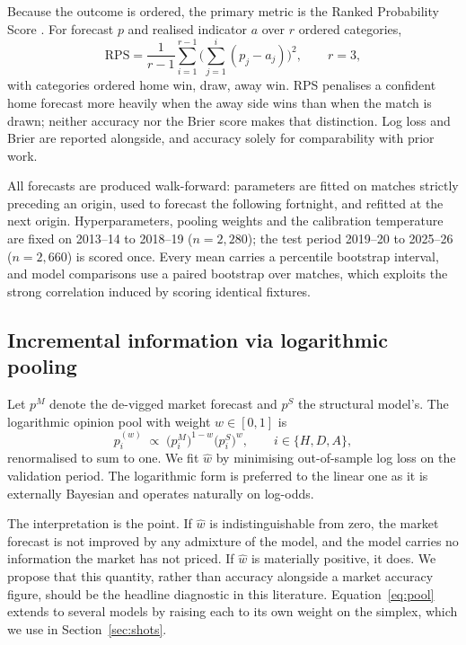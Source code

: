 \documentclass[11pt]{article}
\newcommand{\RPS}{\mathrm{RPS}}
\begin{document}
Because the outcome is ordered, the primary metric is the Ranked Probability
Score \citep{epstein1969,constantinou2012}. For forecast $p$ and realised
indicator $a$ over $r$ ordered categories,
\begin{equation}
\RPS = \frac{1}{r-1}\sum_{i=1}^{r-1}\Bigg(\sum_{j=1}^{i}(p_j - a_j)\Bigg)^{\!2},
\qquad r = 3 ,
\end{equation}
with categories ordered home win, draw, away win. RPS penalises a confident
home forecast more heavily when the away side wins than when the match is
drawn; neither accuracy nor the Brier score makes that distinction. Log loss
and Brier are reported alongside, and accuracy solely for comparability with
prior work.

All forecasts are produced walk-forward: parameters are fitted on matches
strictly preceding an origin, used to forecast the following fortnight, and
refitted at the next origin. Hyperparameters, pooling weights and the
calibration temperature are fixed on 2013--14 to 2018--19 ($n = 2{,}280$); the
test period 2019--20 to 2025--26 ($n = 2{,}660$) is scored once. Every mean
carries a percentile bootstrap interval, and model comparisons use a paired
bootstrap over matches, which exploits the strong correlation induced by
scoring identical fixtures.

\subsection{Incremental information via logarithmic pooling}
\label{sec:pooling}

Let $p^{M}$ denote the de-vigged market forecast and $p^{S}$ the structural
model's. The logarithmic opinion pool \citep{genest1986} with weight
$w \in [0,1]$ is
\begin{equation}
p^{(w)}_i \;\propto\; \big(p^{M}_i\big)^{1-w}\big(p^{S}_i\big)^{w},
\qquad i \in \{H, D, A\},
\label{eq:pool}
\end{equation}
renormalised to sum to one. We fit $\hat w$ by minimising out-of-sample log
loss on the validation period. The logarithmic form is preferred to the linear
one as it is externally Bayesian and operates naturally on log-odds.

The interpretation is the point. If $\hat w$ is indistinguishable from zero,
the market forecast is not improved by any admixture of the model, and the
model carries no information the market has not priced. If $\hat w$ is
materially positive, it does. We propose that this quantity, rather than
accuracy alongside a market accuracy figure, should be the headline diagnostic
in this literature. Equation~\eqref{eq:pool} extends to several models by
raising each to its own weight on the simplex, which we use in
Section~\ref{sec:shots}.
\end{document}

